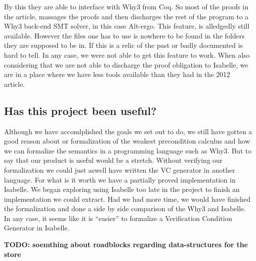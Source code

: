 By this they are able to interface with Why3 from Coq.
So most of the proofs in the article, massages the proofs and then discharges the rest of the program to a Why3 back-end SMT solver, in this case Alt-ergo.
This feature, is alledgedly still available\cite{TODO:LIERS}. However the files one has to use is nowhere to be found in the folders they are supposed to be in.
If this is a relic of the past or badly documented is hard to tell. In any case, we were not able to get this feature to work.
When also considering that we are not able to discharge the proof obligation to Isabelle, we are in a place where we have less tools available than they had in the 2012 article.

\subsection{Has this project been useful?}
Although we have accomlplished the goals we set out to do, we still have gotten a good reason about or formalization of the weakest precondition calculus and how we can formalize the semantics in a programming language such as Why3.
But to say that our product is useful would be a stretch. Without verifying our formalization we could just aswell have written the VC generator in another language.
For what is it worth we have a partially proved implementation in Isabelle.
We began exploring using Isabelle too late in the project to finish an implementation we could extract.
Had we had more time, we would have finished the formalization and done a side by side comparison of the Why3 and Isabelle.
In any case, it seems like it is ``easier'' to formalize a Verification Condition Generator in Isabelle.

\textbf{TODO: soemthing about roadblocks regarding data-structures for the store}

